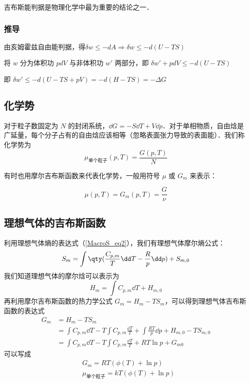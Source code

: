 吉布斯能判据是物理化学中最为重要的结论之一．

\subsubsection{推导}
由亥姆霍兹自由能判据，得$\delta w \le -dA\Rightarrow \delta w \le -d(U-TS)$

将 $w$ 分为体积功 $pdV$ 与非体积功 $w'$ 两部分，即
$\delta w' + pdV \le -d(U-TS)$

即 $\delta w'  \le -d(U-TS+pV) = -d(H-TS) = -\Delta G$

\subsection{化学势}

对于粒子数固定为 $N$ 的封闭系统，$\dd G=-S\dd T+V\dd p$．对于单相物质，自由焓是广延量，每个分子占有的自由焓应该相等（忽略表面张力导致的表面能）．我们称化学势为
\begin{equation}
\mu_{\text{单个粒子}}(p,T)=\frac{G(p,T)}{N}
\end{equation}

有时也用摩尔吉布斯函数来代表化学势，一般用符号 $\mu$ 或 $G_m$ 来表示：

\begin{equation}\label{GibbsG_eq1}
\mu(p,T)=G_m(p,T)=\frac{G}{\nu}
\end{equation}

\subsection{理想气体的吉布斯函数}
利用理想气体熵的表达式（\autoref{MacroS_eq2}），我们有理想气体摩尔熵公式：
\begin{equation}
S_m=\int \qty(\frac{C_{p,m}}{T}\dd T-\frac{R}{p}\dd p)+S_{m,0}
\end{equation}
我们知道理想气体的摩尔焓可以表示为
\begin{equation}
H_m=\int C_{p,m}\dd T+H_{m,0}
\end{equation}
再利用摩尔吉布斯函数的热力学公式 $G_m=H_m-TS_m$，可以得到理想气体吉布斯函数的表达式
\begin{equation}
\begin{aligned}
G_m&=H_m-TS_m\\
&=\int C_{p,m} \dd T - T\int C_{p,m} \frac{\dd T}{T}+\int \frac{RT}{p}\dd p +H_{m,0}-TS_{m,0}
\\
&=\int C_{p,m} \dd T - T\int C_{p,m} \frac{\dd T}{T}+RT\ln p+G_{m0}
\end{aligned}
\end{equation}
可以写成
\begin{equation}\label{GibbsG_eq3}
\begin{aligned}
&G_m=RT(\phi(T)+\ln p)\\
&\mu_{\text{单个粒子}} = kT(\phi(T)+\ln p)
\end{aligned}
\end{equation}

